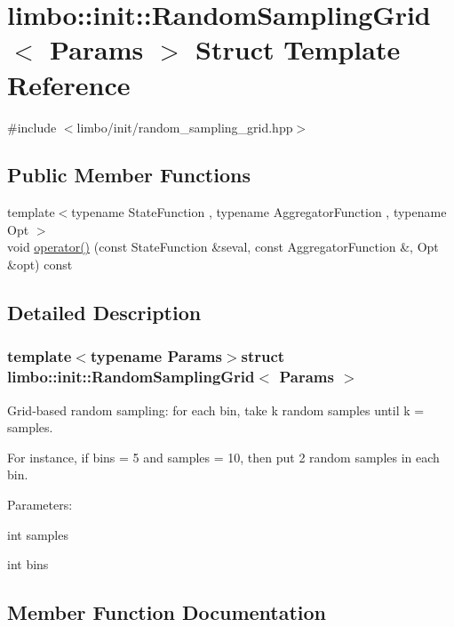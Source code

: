 \hypertarget{structlimbo_1_1init_1_1_random_sampling_grid}{}\section{limbo\+:\+:init\+:\+:Random\+Sampling\+Grid$<$ Params $>$ Struct Template Reference}
\label{structlimbo_1_1init_1_1_random_sampling_grid}


{\ttfamily \#include $<$limbo/init/random\+\_\+sampling\+\_\+grid.\+hpp$>$}

\subsection*{Public Member Functions}
\begin{DoxyCompactItemize}
\item 
{\footnotesize template$<$typename State\+Function , typename Aggregator\+Function , typename Opt $>$ }\\void \hyperlink{structlimbo_1_1init_1_1_random_sampling_grid_a6fd277031f69bf9da891b5f35065c369}{operator()} (const State\+Function \&seval, const Aggregator\+Function \&, Opt \&opt) const 
\end{DoxyCompactItemize}


\subsection{Detailed Description}
\subsubsection*{template$<$typename Params$>$struct limbo\+::init\+::\+Random\+Sampling\+Grid$<$ Params $>$}

Grid-\/based random sampling\+: for each bin, take k random samples until k = samples.

For instance, if bins = 5 and samples = 10, then put 2 random samples in each bin.

Parameters\+:
\begin{DoxyItemize}
\item {\ttfamily int samples}
\item {\ttfamily int bins} 
\end{DoxyItemize}

\subsection{Member Function Documentation}
\hypertarget{structlimbo_1_1init_1_1_random_sampling_grid_a6fd277031f69bf9da891b5f35065c369}{}
